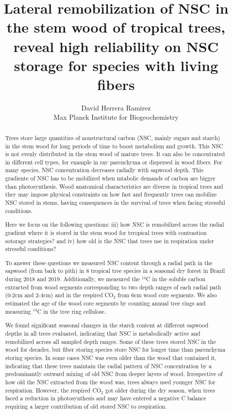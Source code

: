 \documentclass{article}
\title{Lateral remobilization of NSC in the stem wood of tropical trees, reveal high reliability on NSC storage for species with living fibers\\
 }
\author{David Herrera Ramirez \\ Max Planck Institute for Biogeochemistry}
\begin{document}
\maketitle


\begin{abstract}

Trees store large quantities of nonstructural carbon (NSC, mainly sugars and starch) in the stem wood for long periods of time to boost metabolism and growth. 
This NSC is not evenly distributed in the stem wood of mature trees. 
It can also be concentrated in different cell types, for example in ray parenchyma or dispersed in wood fibers.
For many species, NSC concentration decreases radially with sapwood depth.
This gradiente of NSC has to be mobilized when mtabolic demands of carbon are bigger than photosynthesis. 
Wood anatomical characteristics are diverse in tropical trees and they may impose physical constraints on how fast and frequently trees can mobilize NSC stored in stems, having consequences in the survival of trees when facing stressful conditions. 

Here we focus on the following questions: iii) how NSC is remobilized across the radial gradient where it is stored in the stem wood for trropical trees with contrastion sotorage strategies? and iv) how old is the NSC that trees use in respiration under stressful conditions?

To answer these questions we measured NSC content through a radial path in the sapwood (from bark to pith) in 8 tropical tree species in a seasonal dry forest in Brazil during 2018 and 2019. Additionally, we measured the $^{14}$C in the soluble carbon extracted from wood segments corresponding to two depth ranges of each radial path (0-2cm and 2-4cm) and in the respired CO$_{2}$ from 6cm wood core segments. We also estimated the age of the wood core segments by counting annual tree rings and measuring $^{14}$C in the tree ring cellulose.

We found significant seasonal changes in the starch content at different sapwood depths in all trees evaluated, indicating that NSC is metabolically active and remobilized  across all sampled depth ranges. 
Some of these trees stored NSC in the wood for decades, but fiber storing species store NSC for longer time than parenchyma storing species. 
In some cases NSC was even older than the wood that contained it, indicating that these trees maintain the radial pattern of NSC concentration by a predominantly outward mixing of old NSC from deeper layers of wood. 
Irrespective of how old the NSC extracted from the wood was, trees always used younger NSC for respiration. 
However, the respired CO$_{2}$ got older during the dry season, when trees faced a reduction in photosynthesis and may have entered a negative C balance requiring a larger contribution of old stored NSC to respiration.


\end{abstract}
\end{document}
